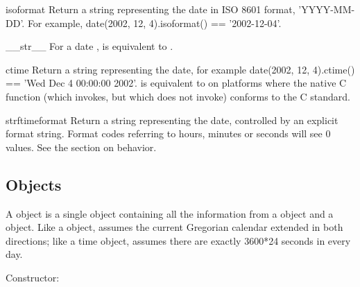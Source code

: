 \begin{methoddesc}{isoformat}{}
  Return a string representing the date in ISO 8601 format,
  'YYYY-MM-DD'.  For example,
  date(2002, 12, 4).isoformat() == '2002-12-04'.
\end{methoddesc}

\begin{methoddesc}{__str__}{}
  For a date ,  is equivalent to
  .
\end{methoddesc}

\begin{methoddesc}{ctime}{}
  Return a string representing the date, for example
  date(2002, 12, 4).ctime() == 'Wed Dec  4 00:00:00 2002'.
   is equivalent to
  on platforms where the native C  function
  (which  invokes, but which
   does not invoke) conforms to the C standard.
\end{methoddesc}

\begin{methoddesc}{strftime}{format}
  Return a string representing the date, controlled by an explicit
  format string.  Format codes referring to hours, minutes or seconds
  will see 0 values.
  See the section on  behavior.
\end{methoddesc}


\subsection{ Objects \label{datetime-datetime}}

A  object is a single object containing all the
information from a  object and a  object.  Like a
 object,  assumes the current Gregorian
calendar extended in both directions; like a time object,
 assumes there are exactly 3600*24 seconds in every
day.

Constructor:

